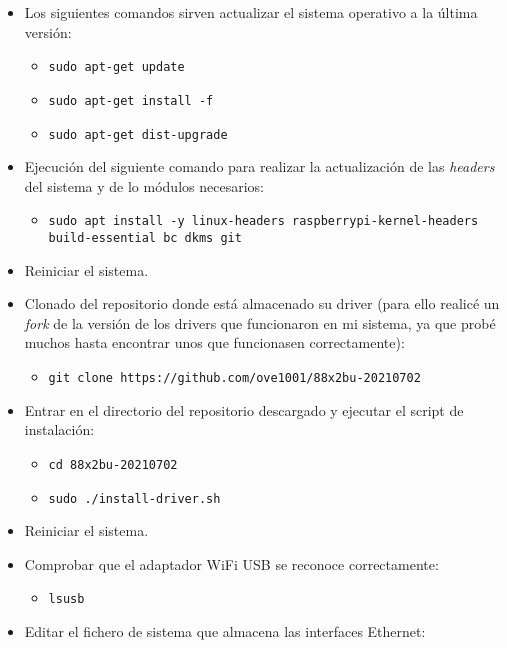     \begin{itemize}
        \item Los siguientes comandos sirven actualizar el sistema operativo a la última versión:
            \begin{itemize}
                \item \texttt{sudo apt-get update}
                \item \texttt{sudo apt-get install -f}
                \item \texttt{sudo apt-get dist-upgrade}
            \end{itemize}
        \item Ejecución del siguiente comando para realizar la actualización de las \textit{headers} del sistema y de lo módulos necesarios:
            \begin{itemize}
                \item \texttt{sudo apt install -y linux-headers raspberrypi-kernel-headers build-essential bc dkms git}
            \end{itemize}
        \item Reiniciar el sistema.
        \item Clonado del repositorio donde está almacenado su driver (para ello realicé un \textit{fork} de la versión de los drivers que funcionaron en mi sistema, ya que probé muchos hasta encontrar unos que funcionasen correctamente):
            \begin{itemize}
                \item \texttt{git clone https://github.com/ove1001/88x2bu-20210702}
            \end{itemize}
        \item Entrar en el directorio del repositorio descargado y ejecutar el script de instalación:
            \begin{itemize}
                \item \texttt{cd 88x2bu-20210702}
                \item \texttt{sudo ./install-driver.sh}
            \end{itemize}
        \item Reiniciar el sistema.
        \item Comprobar que el adaptador WiFi USB se reconoce correctamente:
            \begin{itemize}
                \item \texttt{lsusb}
            \end{itemize}
        \item Editar el fichero de sistema que almacena las interfaces Ethernet: 

\end{itemize}
